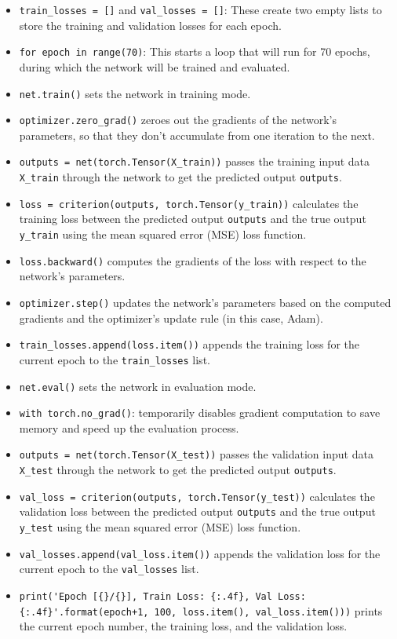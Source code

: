 \begin{itemize}
\item
  \lstinline{train_losses = []} and
  \lstinline{val_losses = []}: These create two empty
  lists to store the training and validation losses for each epoch.
\item
  \lstinline{for epoch in range(70)}: This starts a loop
  that will run for 70 epochs, during which the network will be trained
  and evaluated.
\item
  \lstinline{net.train()} sets the network in training
  mode.
\item
  \lstinline{optimizer.zero_grad()} zeroes out the
  gradients of the network's parameters, so that they don't accumulate
  from one iteration to the next.
\item
  \lstinline{outputs = net(torch.Tensor(X_train))} passes
  the training input data \lstinline{X_train} through the
  network to get the predicted output \lstinline{outputs}.
\item
  \lstinline{loss = criterion(outputs, torch.Tensor(y_train))}
  calculates the training loss between the predicted output
  \lstinline{outputs} and the true output
  \lstinline{y_train} using the mean squared error (MSE)
  loss function.
\item
  \lstinline{loss.backward()} computes the gradients of
  the loss with respect to the network's parameters.
\item
  \lstinline{optimizer.step()} updates the network's
  parameters based on the computed gradients and the optimizer's update
  rule (in this case, Adam).
\item
  \lstinline{train_losses.append(loss.item())} appends
  the training loss for the current epoch to the
  \lstinline{train_losses} list.
\item
  \lstinline{net.eval()} sets the network in evaluation
  mode.
\item
  \lstinline{with torch.no_grad()}: temporarily disables
  gradient computation to save memory and speed up the evaluation
  process.
\item
  \lstinline{outputs = net(torch.Tensor(X_test))} passes
  the validation input data \lstinline{X_test} through
  the network to get the predicted output
  \lstinline{outputs}.
\item
  \lstinline{val_loss = criterion(outputs, torch.Tensor(y_test))}
  calculates the validation loss between the predicted output
  \lstinline{outputs} and the true output
  \lstinline{y_test} using the mean squared error (MSE)
  loss function.
\item
  \lstinline{val_losses.append(val_loss.item())} appends
  the validation loss for the current epoch to the
  \lstinline{val_losses} list.
\item
  \lstinline|print('Epoch [{}/{}], Train Loss: {:.4f}, Val Loss: {:.4f}'.format(epoch+1, 100, loss.item(), val_loss.item()))|
  prints the current epoch number, the training loss, and the validation
  loss.
\end{itemize}


